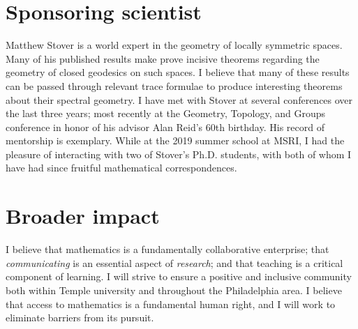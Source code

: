 \documentclass[12pt]{article}
\begin{document}
\section{Sponsoring scientist}
Matthew Stover is a world expert in the geometry of locally symmetric spaces. Many of his published results make prove incisive theorems regarding the geometry of closed geodesics on such spaces. I believe that many of these results can be passed through relevant trace formulae to produce interesting theorems about their spectral geometry. I have met with Stover at several conferences over the last three years; most recently at the Geometry, Topology, and Groups conference in honor of his advisor Alan Reid's 60th birthday. His record of mentorship is exemplary. While at the 2019 summer school at MSRI, I had the pleasure of interacting with two of Stover's Ph.D. students, with both of whom I have had since fruitful mathematical correspondences.   


\section{Broader impact}
I believe that mathematics is a fundamentally collaborative enterprise; that \emph{communicating} is an essential aspect of \emph{research}; and that teaching is a critical component of learning. I will strive to ensure a positive and inclusive community both within Temple university and throughout the Philadelphia area. I believe that access to mathematics is a fundamental human right, and I will work to eliminate barriers from its pursuit.    

\newpage

 

\end{document}
